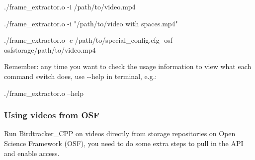 \begin{DoxyCode}
./frame\_extractor.o -i /path/to/video.mp4
\end{DoxyCode}
 
\begin{DoxyCode}
./frame\_extractor.o -i "/path/to/video with spaces.mp4"
\end{DoxyCode}



\begin{DoxyCode}
./frame\_extractor.o -c /path/to/special\_config.cfg -osf osfstorage/path/to/video.mp4
\end{DoxyCode}


Remember\+: any time you want to check the usage information to view what each command switch does, use {\ttfamily -\/-\/help} in terminal, e.\+g.\+:


\begin{DoxyCode}
./frame\_extractor.o --help
\end{DoxyCode}


\subsubsection*{Using videos from O\+SF}

Run Birdtracker\+\_\+\+C\+PP on videos directly from storage repositories on Open Science Framework (O\+SF), you need to do some extra steps to pull in the A\+PI and enable access.


